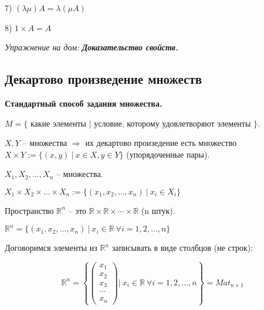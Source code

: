 7) $(\lambda \mu) A = \lambda (\mu A)$

8) $1 \times A = A$

\vspace{\baselineskip}
\textit{Упражнение на дом:} \textbf{\textit{Доказательство свойств.}}

\vspace{\baselineskip}
\begin{comment}
	Свойства (1)-(8) означают, что $Mat_{m\times n}$ является             векторным пространством.
\end{comment}

\vspace{\baselineskip}
\subsection{Декартово произведение множеств}

\vspace{\baselineskip}
\textbf{Стандартный способ задания множества.}

\vspace{\baselineskip}
$M = \{$ какие элементы $|$ условие, которому удовлетворяют элементы $\}$.

\vspace{\baselineskip}
$X, Y$ -- множества $\Rightarrow$ их декартово произедение есть множество $X \times Y := \{ (x, y) \ | \ x \in X, y \in Y\}$ (упорядоченные пары).

$X_1, X_2, \dots, X_n$ -- множества.

$X_1 \times X_2 \times \dots \times X_n := \{(x_1, x_2, \dots, x_n) \ | \ x_i \in X_i\}$

Пространство $\mathbb{R}^n$ -- это $\mathbb{R} \times \mathbb{R} \times \cdots \times \mathbb{R}$ (n штук).

$\mathbb{R}^n = \{ (x_1, x_2, \dots, x_n) \ | \ x_i \in \mathbb{R} \  \forall i = 1, 2, \dots, n \}$

\vspace{\baselineskip}
Договоримся элементы из $\mathbb{R}^n$ записывать в виде столбцов (не строк):

\begin{equation*} \mathbb{R}^n = \left\{ \begin{pmatrix}
    x_1 \\
    x_2 \\
    x_3 \\
    \cdots \\
    x_n
	\end{pmatrix} | \ x_i \in \mathbb{R} \ \forall i = 1, 2, \dots , n \right\} = Mat_{n \times 1}
\end{equation*}


